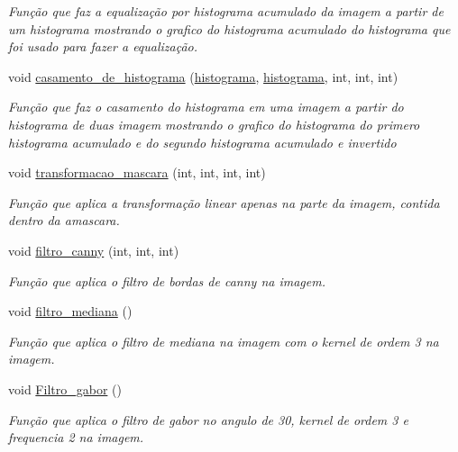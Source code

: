 \begin{DoxyCompactItemize}
\begin{DoxyCompactList}\small\item\em Função que faz a equalização por histograma acumulado da imagem a partir de um histograma mostrando o grafico do histograma acumulado do histograma que foi usado para fazer a equalização. \end{DoxyCompactList}\item 
void \mbox{\hyperlink{classimagem_adf6ca234d55595b5518e189afd24349c}{casamento\+\_\+de\+\_\+histograma}} (\mbox{\hyperlink{classhistograma}{histograma}}, \mbox{\hyperlink{classhistograma}{histograma}}, int, int, int)
\begin{DoxyCompactList}\small\item\em Função que faz o casamento do histograma em uma imagem a partir do histograma de duas imagem mostrando o grafico do histograma do primero histograma acumulado e do segundo histograma acumulado e invertido ~\newline
 \end{DoxyCompactList}\item 
void \mbox{\hyperlink{classimagem_aec30a377384b60c26e1595a7505a1d13}{transformacao\+\_\+mascara}} (int, int, int, int)
\begin{DoxyCompactList}\small\item\em Função que aplica a transformação linear apenas na parte da imagem, contida dentro da amascara. \end{DoxyCompactList}\item 
void \mbox{\hyperlink{classimagem_a42b09a684f856cd47aa638f2878a2c74}{filtro\+\_\+canny}} (int, int, int)
\begin{DoxyCompactList}\small\item\em Função que aplica o filtro de bordas de canny na imagem. \end{DoxyCompactList}\item 
void \mbox{\hyperlink{classimagem_a58e307bbc753f8c5fb9ba3d434a30617}{filtro\+\_\+mediana}} ()
\begin{DoxyCompactList}\small\item\em Função que aplica o filtro de mediana na imagem com o kernel de ordem 3 na imagem. \end{DoxyCompactList}\item 
\mbox{\label{classimagem_a9132e1ac177b315c0d322ed6a88a94d0}} 
void \mbox{\hyperlink{classimagem_a9132e1ac177b315c0d322ed6a88a94d0}{Filtro\+\_\+gabor}} ()
\begin{DoxyCompactList}\small\item\em Função que aplica o filtro de gabor no angulo de 30, kernel de ordem 3 e frequencia 2 na imagem. \end{DoxyCompactList}\item 

\end{DoxyCompactItemize}
